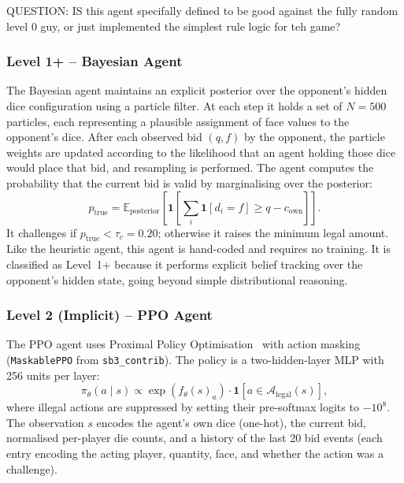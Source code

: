 \documentclass{article}
\begin{document}
  QUESTION: IS this agent specifally defined to be good against the fully random level 0 guy, or just implemented the simplest rule logic for teh game?

  \subsubsection{Level 1+ -- Bayesian Agent}

  The Bayesian agent maintains an explicit posterior over the opponent's hidden
  dice configuration using a particle filter. At each step it holds a set of
  $N = 500$ particles, each representing a plausible assignment of face values to
  the opponent's dice. After each observed bid $(q, f)$ by the opponent, the
  particle weights are updated according to the likelihood that an agent holding
  those dice would place that bid, and resampling is performed. The agent computes
  the probability that the current bid is valid by marginalising over the posterior:
  \[
    p_{\text{true}} = \mathbb{E}_{\text{posterior}}\!\left[
      \mathbf{1}\!\left[\sum_i \mathbf{1}[d_i = f] \geq q - c_{\text{own}}\right]
    \right].
  \]
  It challenges if $p_{\text{true}} < \tau_c = 0.20$; otherwise it raises the
  minimum legal amount. Like the heuristic agent, this agent is hand-coded and
  requires no training. It is classified as Level~1+ because it performs explicit
  belief tracking over the opponent's hidden state, going beyond simple
  distributional reasoning.

  \subsubsection{Level 2 (Implicit) -- PPO Agent}

  The PPO agent uses Proximal Policy Optimisation~\cite{schulman2017proximal} with
  action masking~\cite{huang2020closer} (\texttt{MaskablePPO} from
  \texttt{sb3\_contrib}). The policy is a two-hidden-layer MLP with 256 units per
  layer:
  \[
    \pi_\theta(a \mid s) \propto \exp\!\left( f_\theta(s)_a \right) \cdot
      \mathbf{1}[a \in \mathcal{A}_{\text{legal}}(s) ],
  \]
  where illegal actions are suppressed by setting their pre-softmax logits to
  $-10^8$. The observation $s$ encodes the agent's own dice (one-hot), the current
  bid, normalised per-player die counts, and a history of the last 20 bid events
  (each entry encoding the acting player, quantity, face, and whether the action
  was a challenge).
\end{document}
